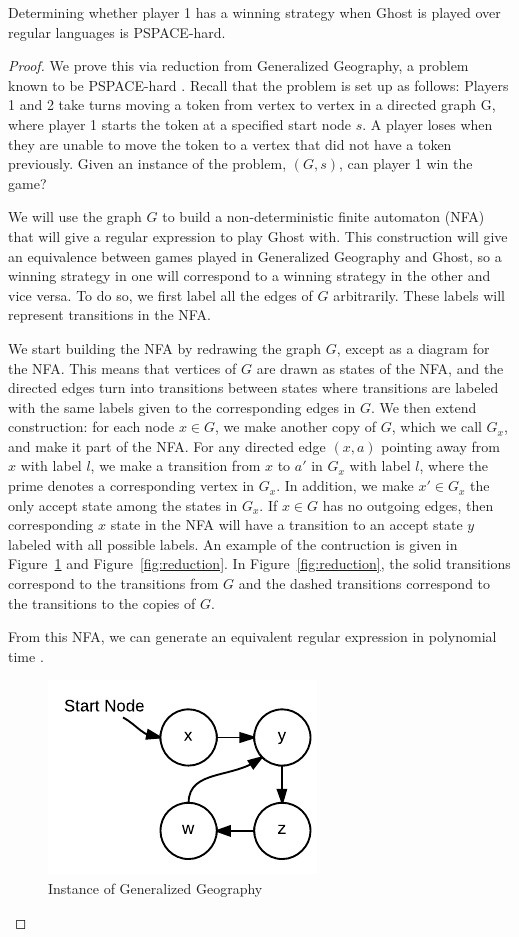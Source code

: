 \documentclass[runningheads,a4paper]{llncs}
\begin{document}
\begin{theorem} Determining whether player 1 has a winning strategy when Ghost is played over regular languages is PSPACE-hard.
\end{theorem}
\begin{proof} We prove this via reduction from Generalized Geography, a problem known to be PSPACE-hard \cite{theoryofcomp}. Recall that the problem is set up as follows:
Players 1 and 2 take turns moving a token from vertex to vertex in a directed graph G, where player 1 starts the token at a specified start node $s$. A player loses when they are unable to move the token to a vertex that did not have a token previously. Given an instance of the problem, $(G,s)$, can player 1 win the game?

We will use the graph $G$ to build a non-deterministic finite automaton (NFA) that will give a regular expression to play Ghost with. This construction will give an equivalence between games played in Generalized Geography and Ghost, so a winning strategy in one will correspond to a winning strategy in the other and vice versa. To do so, we first label all the edges of $G$ arbitrarily. These labels will represent transitions in the NFA.

We start building the NFA by redrawing the graph $G$, except as a diagram for the NFA. This means that vertices of $G$ are drawn as states of the NFA, and the directed edges turn into transitions between states where transitions are labeled with the same labels given to the corresponding edges in $G$. We then extend construction: for each node $x\in G$, we make another copy of $G$, which we call $G_x$, and make it part of the NFA. For any directed edge $(x,a)$ pointing away from $x$ with label $l$, we make a transition from $x$ to $a'$ in $G_x$ with label $l$, where the prime denotes a corresponding vertex in $G_x$. In addition, we make $x' \in G_x$  the only accept state among the states in $G_x$. If $x\in G$ has no outgoing edges, then corresponding $x$ state in the NFA will have a transition to an accept state $y$ labeled with all possible labels. An example of the contruction is given in Figure~\ref{fig:instance} and Figure~\ref{fig:reduction}. In Figure~\ref{fig:reduction}, the solid transitions correspond to the transitions from $G$ and the dashed transitions correspond to the transitions to the copies of $G$.

From this NFA, we can generate an equivalent regular expression in polynomial time \cite{theoryofcomp}.
\begin{figure}[ht]
\centering
\includegraphics[width=0.3\linewidth]{Ghost1.pdf}
\caption{Instance of Generalized Geography}
\label{fig:instance}
\end{figure}


\end{proof}
\end{document}
